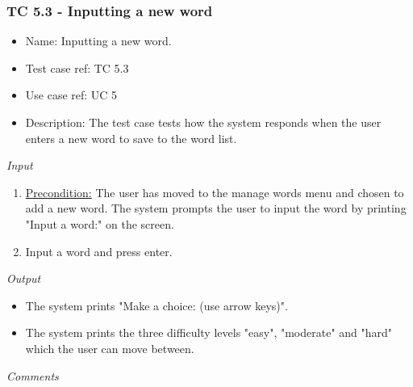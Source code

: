 \documentclass[12pt, letterpaper]{article}
\begin{document}
\subsubsection{TC 5.3 - Inputting a new word}
\begin{itemize}
	\item Name: Inputting a new word.
	\item Test case ref: TC 5.3
	\item Use case ref: UC 5
	\item Description: The test case tests how the system responds when the user enters a new word to save to the word list.
\end{itemize}
\emph{Input}
\begin{enumerate}
	\item \underline{Precondition:} The user has moved to the manage words menu and chosen to add a new word. The system prompts the user to input the word by printing "Input a word:" on the screen.
	\item Input a word and press enter.
\end{enumerate}
\emph{Output}
\begin{itemize}
	\item The system prints "Make a choice: (use arrow keys)".
	\item The system prints the three difficulty levels "easy", "moderate" and "hard" which the user can move between.
\end{itemize}
\begin{Form}
\newline
{}
\newline
\end{Form}
\newline
\emph{Comments}
\newline
\newline
\newline
\newline
\newline
\newline
\newline
\end{document}
